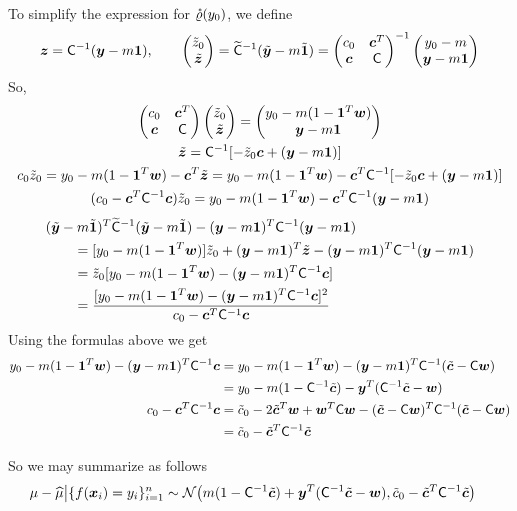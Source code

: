 \documentclass[graybox]{svmult}
\newcommand{\bsone}{\boldsymbol{1}}  %
\newcommand{\bsw}{\boldsymbol{w}}    %
\newcommand{\bsx}{\boldsymbol{x}}    %
\newcommand{\bsy}{\boldsymbol{y}}    %
\newcommand{\bsz}{\boldsymbol{z}}    %
\newcommand{\mC}{\mathsf{C}}
\begin{document}
To simplify the expression for $\mathring{\varrho}(y_0)$, we define
\[
\bsz = \mC^{-1} (\bsy - m \bsone), \qquad 
\begin{pmatrix} \tz_0 \\ \tbsz \end{pmatrix} = \tmC^{-1} (\tbsy - m \tbsone) 
= \begin{pmatrix} c_0 & \bsc^T \\ \bsc & \mC \end{pmatrix}^{-1} \begin{pmatrix} y_0 - m \\ \bsy - m \bsone \end{pmatrix}
\]
So,
\begin{gather*}
\begin{pmatrix} c_0 & \bsc^T \\ \bsc & \mC \end{pmatrix} \begin{pmatrix} \tz_0 \\ \tbsz \end{pmatrix} 
= \begin{pmatrix} y_0 - m(1 - \bsone^T\bsw) \\ \bsy - m \bsone \end{pmatrix} \\
\tbsz = \mC^{-1}[-\tz_0 \bsc + (\bsy - m \bsone )] \\
c_0 \tz_0 =y_0 - m(1 - \bsone^T\bsw)  - \bsc^T\tbsz =  y_0 - m(1 - \bsone^T\bsw)  - \bsc^T\mC^{-1}[-\tz_0 \bsc + (\bsy - m \bsone )] \\
(c_0 - \bsc^T\mC^{-1} \bsc) \tz_0 = y_0 - m(1 - \bsone^T\bsw)  - \bsc^T\mC^{-1}(\bsy - m \bsone )
\end{gather*}
\begin{align*}
\MoveEqLeft(\tbsy - m \tbsone)^T \tmC^{-1} (\tbsy - m \tbsone) - (\bsy - m \bsone)^T \mC^{-1} (\bsy - m \bsone) \\
& = [y_0 - m(1 - \bsone^T\bsw)] \tz_0 + (\bsy - m \bsone)^T \tbsz - (\bsy - m \bsone)^T \mC^{-1} (\bsy - m \bsone) \\
& = \tz_0 [y_0 - m(1 - \bsone^T\bsw)  -  (\bsy - m \bsone)^T \mC^{-1} \bsc ] \\
& = \frac{[y_0 - m(1 - \bsone^T\bsw)  -  (\bsy - m \bsone)^T \mC^{-1} \bsc ]^2}{c_0 - \bsc^T\mC^{-1} \bsc}
\end{align*}
Using the formulas above we get
\begin{align*}
y_0 - m(1 - \bsone^T\bsw)  -  (\bsy - m \bsone)^T \mC^{-1} \bsc & = y_0 - m(1 - \bsone^T\bsw)  -  (\bsy - m \bsone)^T \mC^{-1}(\tbsc - \mC \bsw) \\
& = y_0 - m(1 - \mC^{-1}\tbsc) -  \bsy^T (\mC^{-1}\tbsc - \bsw) \\
c_0 - \bsc^T\mC^{-1} \bsc & = \tc_0 -2 \tbsc^T \bsw + \bsw^T \mC \bsw - (\tbsc - \mC \bsw)^T \mC^{-1} (\tbsc - \mC \bsw) \\
& =  \tc_0 - \tbsc ^T \mC^{-1} \tbsc
\end{align*}

So we may summarize as follows
\begin{align*}
\mu - \hmu \big \vert \{f(\bsx_i )= y_i\}_{i=1}^n &\sim \cn \bigl(m(1 - \mC^{-1}\tbsc) +  \bsy^T (\mC^{-1}\tbsc - \bsw), \tc_0 - \tbsc ^T \mC^{-1} \tbsc \bigr)
\end{align*}
\end{document}
